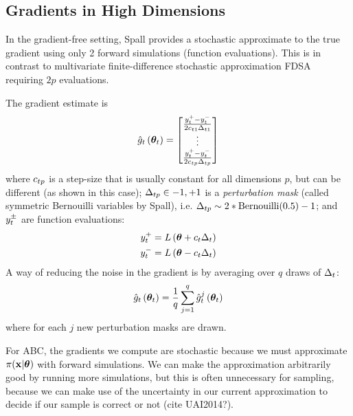 \documentclass[]{article}
\begin{document}
\subsection{Gradients in High Dimensions}

In the gradient-free setting, Spall \cite{spall1992multivariate} provides a stochastic approximate to the true gradient using only 2 forward simulations (function evaluations).  This is in contrast to multivariate finite-difference stochastic approximation FDSA \cite{kiefer1952stochastic} requiring $2p$ evaluations.  

The gradient estimate is
\begin{equation}
  \gradestimate{t}{\thetav_t} = \begin{bmatrix} 
                                   \frac{\feval{t}{+} - \feval{t}{-}}{2 \cstep{t}{1} \dstep{t}{1}} \\
                                   \vdots \\
                                   \frac{\feval{t}{+} - \feval{t}{-}}{2 \cstep{t}{p} \dstep{t}{p}} \\
                                \end{bmatrix}
\end{equation}
where $\cstep{t}{p}$ is a step-size that is usually constant for all dimensions $p$, but can be different (as shown in this case); $\dstep{t}{p} \in {-1, +1}$ is a {\em perturbation mask} (called symmetric Bernouilli variables by Spall), i.e. $\dstep{t}{p} \sim 2*\text{Bernouilli}(0.5) - 1$; and  $\feval{t}{\pm}$ are function evaluations:
\begin{eqnarray}
  \feval{t}{+} &= \loglik{\thetav + \cstepconst{t}\dstepconst{t}} \\
  \feval{t}{-} &= \loglik{\thetav - \cstepconst{t}\dstepconst{t}}
\end{eqnarray}
A way of reducing the noise in the gradient is by averaging over $q$ draws of $\dstepconst{t}$:
\begin{equation}
  \gradestimate{t}{\thetav_t} = \frac{1}{q} \sum_{j=1}^q \gradestimaterepeat{t}{\thetav_t}{j}
\end{equation}
where for each $j$ new perturbation masks are drawn.
  

For ABC, the gradients we compute are stochastic because we must approximate $\pi(\x | \thetav)$ with forward simulations.  We can make the approximation arbitrarily good by running more simulations, but this is often unnecessary for sampling, because we can make use of the uncertainty in our current approximation to decide if our sample is correct or not (cite UAI2014?).  
\end{document}
